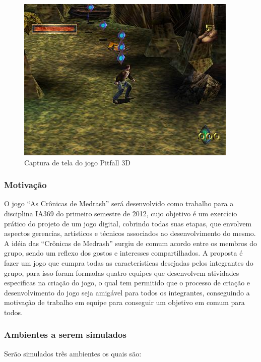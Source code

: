 \begin{itemize}
\begin{figure}[!ht]
 \centering
 \includegraphics[scale=0.8]{Imagens/pit2.png}
 \caption{Captura de tela do jogo Pitfall 3D}
 \label{img:pitfall2}
\end{figure}

\end{itemize}

\subsubsection{Motivação}

O jogo ``As Crônicas de Medrash'' será desenvolvido como trabalho para
 a disciplina IA369 do primeiro semestre de 2012, cujo objetivo é um exercício 
prático do projeto de um jogo digital, cobrindo todas suas etapas, que envolvem 
aspectos gerencias, artísticos e técnicos associados ao desenvolvimento do mesmo.
A idéia das ``Crônicas de Medrash'' surgiu de comum acordo entre os membros
 do grupo, sendo um reflexo dos gostos e interesses compartilhados. A proposta 
é fazer um jogo que cumpra todas as características desejadas pelos integrantes 
do grupo, para isso foram formadas quatro equipes que desenvolvem atividades 
especificas na criação do jogo, o qual tem permitido que o processo de criação e 
desenvolvimento do jogo seja amigável para todos os integrantes, conseguindo 
a motivação de trabalho em equipe para conseguir um objetivo em comum para todos.

\subsubsection{Ambientes a serem simulados}
Serão simulados três ambientes os quais são:


